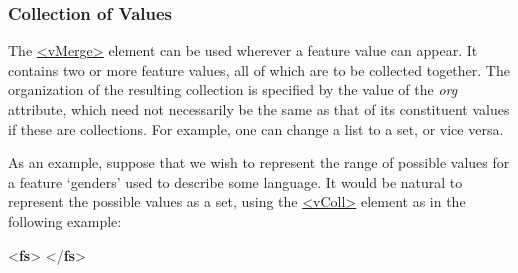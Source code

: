 \subsubsection[{Collection of Values}]{Collection of Values}\label{FVCOLL}\par
The \hyperref[TEI.vMerge]{<vMerge>} element can be used wherever a feature value can appear. It contains two or more feature values, all of which are to be collected together. The organization of the resulting collection is specified by the value of the {\itshape org} attribute, which need not necessarily be the same as that of its constituent values if these are collections. For example, one can change a list to a set, or vice versa.\par
As an example, suppose that we wish to represent the range of possible values for a feature ‘genders’ used to describe some language. It would be natural to represent the possible values as a set, using the \hyperref[TEI.vColl]{<vColl>} element as in the following example: \par\bgroup{}\exampleFont \begin{shaded}\noindent\mbox{}{<\textbf{fs}>}\mbox{}\newline 
{}\mbox{}\newline 
\hspace*{1em}\mbox{}\newline 
\hspace*{1em}\hspace*{1em}\mbox{}\newline 
\hspace*{1em}\hspace*{1em}\mbox{}\newline 
\hspace*{1em}\mbox{}\newline 
{}\mbox{}\newline 
{</\textbf{fs}>}\end{shaded}\egroup\par \par
